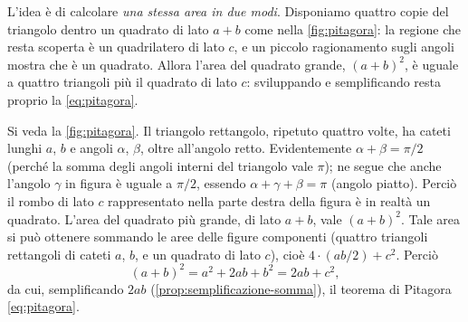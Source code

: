 \begin{schema}
\end{schema}

\begin{strategia}
L'idea è di calcolare \emph{una stessa area in due modi}. Disponiamo quattro copie del
triangolo dentro un quadrato di lato $a+b$ come nella \cref{fig:pitagora}: la regione
che resta scoperta è un quadrilatero di lato $c$, e un piccolo ragionamento sugli
angoli mostra che è un quadrato. Allora l'area del quadrato grande, $(a+b)^{2}$, è
uguale a quattro triangoli più il quadrato di lato $c$: sviluppando e semplificando
resta proprio la \eqref{eq:pitagora}.
\end{strategia}

\begin{dimostrazione}
Si veda la \cref{fig:pitagora}. Il triangolo rettangolo, ripetuto quattro volte, ha
cateti lunghi $a$, $b$ e angoli $\alpha$, $\beta$, oltre all'angolo retto. Evidentemente
$\alpha+\beta=\pi/2$ (perché la somma degli angoli interni del triangolo vale $\pi$);
ne segue che anche l'angolo $\gamma$ in figura è uguale a $\pi/2$, essendo
$\alpha+\gamma+\beta=\pi$ (angolo piatto). Perciò il rombo di lato $c$ rappresentato nella
parte destra della figura è in realtà un quadrato. L'area del quadrato più grande, di
lato $a+b$, vale $(a+b)^{2}$. Tale area si può ottenere sommando le aree delle figure
componenti (quattro triangoli rettangoli di cateti $a$, $b$, e un quadrato di lato
$c$), cioè $4\cdot(ab/2)+c^{2}$. Perciò
\[
  (a+b)^{2}=a^{2}+2ab+b^{2}=2ab+c^{2},
\]
da cui, semplificando $2ab$ (\cref{prop:semplificazione-somma}), il teorema di Pitagora
\eqref{eq:pitagora}.
\end{dimostrazione}

